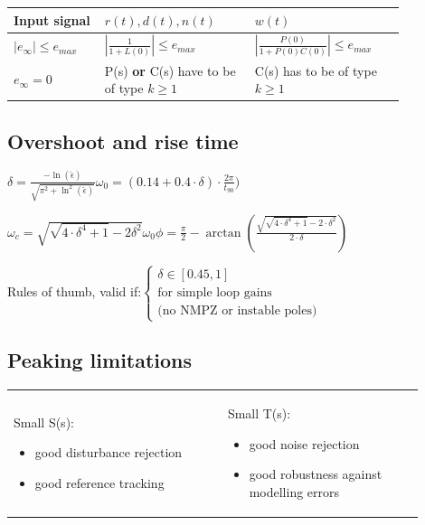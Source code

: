 \documentclass[10pt,a4paper]{scrartcl}
\begin{document}
\begin{multicols*}{3}
	\small
	\begin{tabular}{|p{0.2\linewidth}|p{0.33\linewidth}            |p{0.33\linewidth}|}
	\hline
	Input signal & $r(t),d(t),n(t)$&$w(t)$\\
	\hline
	$|e_\infty|\leq e_{max}$&$|\frac{1}{1+L(0)}|\leq e_{max}$&$|\frac{P(0)}{1+P(0)C(0)}|\leq e_{max}$\\
	\hline
	$e_\infty=0$&P(s) \textbf{or} C(s) have to be of type $k\geq 1$&C(s) has to be of type $k\geq 1$\\
	\hline
	\end{tabular}
	\normalsize
	
	\subsection*{Overshoot and rise time}
	
	\small
	$\delta = \frac{-\ln(\hat{\epsilon})}{\sqrt{\pi^2+\ln^2(\hat{\epsilon})}}$\hfill$\omega_0=(0.14+0.4\cdot\delta)\cdot\frac{2\pi}{t_{90}})$
	
	$\omega_c=\sqrt{\sqrt{4\cdot \delta^4+1}-2\delta^2}\omega_0$\hfill$\phi=\frac{\pi}{2}-\arctan\left(\frac{\sqrt{\sqrt{4\cdot\delta^4+1}-2\cdot\delta^2}}{2\cdot\delta}\right)$
	\normalsize	
	
	\finn

	\dahe Rules of thumb, valid if:$\begin{cases}\delta\in[0.45,1]&\\ \text{for simple loop gains}&\\ \text{(no NMPZ or instable poles)}&\end{cases}$
	
	
	
	\subsection*{Peaking limitations}
	\footnotesize
	\begin{tabular}{p{0.47\linewidth}p{0.43\linewidth}}
	Small S(s):
	\begin{itemize}
	\compaq
	\item good disturbance rejection
	\item good reference tracking
	\end{itemize}	
	&
	Small T(s):
	\begin{itemize}
	\compaq
	\item good noise rejection
	\item good robustness against modelling errors
	\end{itemize}
	\normalsize
	\end{tabular}
	

\end{multicols*}
\end{document}
